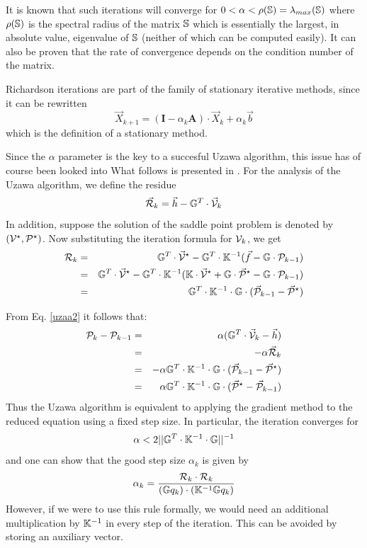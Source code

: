 It is known that such iterations will converge for $0< \alpha < \rho({\mathbb{S}})= \lambda_{max}({\mathbb{S}})$ 
where $\rho({\mathbb{S}})$ is the spectral radius of the matrix ${\mathbb{S}}$
which is essentially the largest, in absolute value, eigenvalue of ${\mathbb{S}}$ (neither of which 
can be computed easily).  
It can also be proven that the rate of convergence depends on the condition number of the matrix.

Richardson iterations are part of the family of stationary iterative methods, since it can be rewritten 
\[
{\vec X}_{k+1} = ({\bm I} - \alpha_k {\bm A} ) \cdot {\vec X}_k + \alpha_k {\vec b}
\]
which is the definition of a stationary method. 


Since the $\alpha$ parameter is the key to a succesful Uzawa algorithm, 
this issue has of course been looked into What follows is 
presented in \cite[p221]{braess}.
For the analysis of the Uzawa algorithm, we define the residue
\[
\vec {\cal R}_k = \vec h - \mathbb{G}^T \cdot \vec{\cal V}_k
\]
In addition, suppose the solution of the saddle point problem is denoted
by $({\cal V}^\star,{\cal P}^\star)$.
Now substituting the iteration formula for ${\cal V}_k$, we get
\begin{eqnarray}
{\cal R}_k 
&=& {\mathbb{G}}^T\cdot\vec{\cal V}^\star -\mathbb{G}^T\cdot \mathbb{K}^{-1} (\vec f - \mathbb{G}\cdot {\cal P}_{k-1}) \\
&=& {\mathbb{G}}^T\cdot\vec{\cal V}^\star -\mathbb{G}^T\cdot \mathbb{K}^{-1} ({\mathbb{K}}\cdot\vec{\cal V}^\star + {\mathbb{G}}\cdot\vec{\cal P}^\star - \mathbb{G}\cdot {\cal P}_{k-1}) \\
&=& \mathbb{G}^T \cdot \mathbb{K}^{-1} \cdot \mathbb{G}\cdot (\vec {\cal P}_{k-1} - \vec{\cal P}^\star) 
\end{eqnarray}

From Eq. \ref{uzaa2} it follows that:
\begin{eqnarray}
{\cal P}_k - {\cal P}_{k-1}  
&=& \alpha (\mathbb{G}^T\cdot \vec{\cal V}_k -\vec h) \\
&=& -\alpha \vec{\cal R}_k \\ 
&=& -\alpha \mathbb{G}^T \cdot \mathbb{K}^{-1} \cdot \mathbb{G}\cdot (\vec {\cal P}_{k-1} - \vec{\cal P}^\star)\\ 
&=& \alpha \mathbb{G}^T \cdot \mathbb{K}^{-1} \cdot \mathbb{G}\cdot 
(\vec{\cal P}^\star - \vec {\cal P}_{k-1} ) 
\end{eqnarray}
Thus the Uzawa algorithm is equivalent to applying the gradient method 
to the reduced equation using a fixed step size. 
In particular, the iteration converges for
\[
\alpha < 2 || {\mathbb{G}}^T \cdot {\mathbb{K}}^{-1} \cdot {\mathbb{G}} ||^{-1}
\]
and one can show that the good step size $\alpha_k$ is given by 
\begin{equation}
\alpha_k = \frac{{\cal R}_k \cdot {\cal R}_k}{({\mathbb{G}} q_k)\cdot ({\mathbb{K}}^{-1} {\mathbb{G}} q_k)}
\label{uzaa3}
\end{equation}
However, if we were to use this rule formally, we would 
need an additional multiplication by ${\mathbb{K}}^{-1}$ in every step 
of the iteration. This can be avoided by storing an 
auxiliary vector. 

